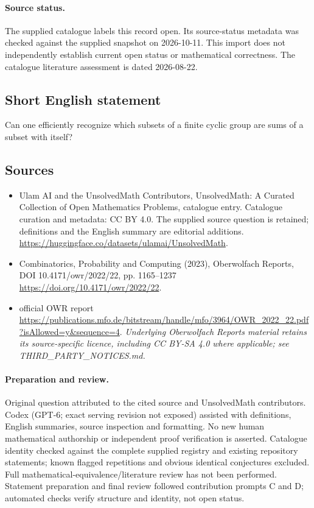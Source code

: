 \documentclass[11pt]{article}
\begin{document}
\paragraph{Source status.}
The supplied catalogue labels this record open. Its source-status metadata was checked against the supplied snapshot on 2026-10-11. This import does not independently establish current open status or mathematical correctness. The catalogue literature assessment is dated 2026-08-22.
\subsection{Short English statement}
Can one efficiently recognize which subsets of a finite cyclic group are sums of a subset with itself?
\subsection{Sources}
\begin{itemize}
\item[S1] Ulam AI and the UnsolvedMath Contributors, UnsolvedMath: A Curated Collection of Open Mathematics Problems, catalogue entry. Catalogue curation and metadata: CC BY 4.0. The supplied source question is retained; definitions and the English summary are editorial additions.
\url{https://huggingface.co/datasets/ulamai/UnsolvedMath}.
\item[S2] Combinatorics, Probability and Computing (2023), Oberwolfach Reports, DOI 10.4171/owr/2022/22, pp. 1165--1237
\url{https://doi.org/10.4171/owr/2022/22}.
\item[S3] official OWR report
\url{https://publications.mfo.de/bitstream/handle/mfo/3964/OWR_2022_22.pdf?isAllowed=y&sequence=4}.
\textit{Underlying Oberwolfach Reports material retains its source-specific licence, including CC BY-SA 4.0 where applicable; see THIRD\_PARTY\_NOTICES.md.}
\end{itemize}
\paragraph{Preparation and review.}
Original question attributed to the cited source and UnsolvedMath contributors. Codex (GPT-6; exact serving revision not exposed) assisted with definitions, English summaries, source inspection and formatting. No new human mathematical authorship or independent proof verification is asserted. Catalogue identity checked against the complete supplied registry and existing repository statements; known flagged repetitions and obvious identical conjectures excluded. Full mathematical-equivalence/literature review has not been performed. Statement preparation and final review followed contribution prompts C and D; automated checks verify structure and identity, not open status.
\label{end:statement}
\end{document}
